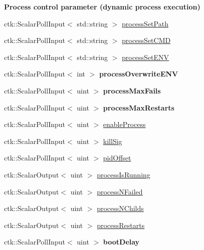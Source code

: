 \begin{Indent}{\bf Process control parameter (dynamic process execution)}\par
\begin{DoxyCompactItemize}
\item 
ctk\+::\+Scalar\+Poll\+Input$<$ std\+::string $>$ \hyperlink{structProcessControlModule_a2f3edf4b64217d9242034e876b74271e}{process\+Set\+Path}
\item 
ctk\+::\+Scalar\+Poll\+Input$<$ std\+::string $>$ \hyperlink{structProcessControlModule_a0f8c1a2b80ca32287fa60af12da681f7}{process\+Set\+C\+MD}
\item 
ctk\+::\+Scalar\+Poll\+Input$<$ std\+::string $>$ \hyperlink{structProcessControlModule_a95ed5208eb6265f71be5c96fa9b1bfd6}{process\+Set\+E\+NV}
\item 
ctk\+::\+Scalar\+Poll\+Input$<$ int $>$ {\bfseries process\+Overwrite\+E\+NV}
\item 
ctk\+::\+Scalar\+Poll\+Input$<$ uint $>$ {\bfseries process\+Max\+Fails}
\item 
ctk\+::\+Scalar\+Poll\+Input$<$ uint $>$ {\bfseries process\+Max\+Restarts}
\item 
ctk\+::\+Scalar\+Poll\+Input$<$ uint $>$ \hyperlink{structProcessControlModule_a0e5511753b568a4fde7d00caa1575299}{enable\+Process}
\item 
ctk\+::\+Scalar\+Poll\+Input$<$ uint $>$ \hyperlink{structProcessControlModule_a47ea8ec5bf7aa3914bb61f12c6aefe59}{kill\+Sig}
\item 
ctk\+::\+Scalar\+Poll\+Input$<$ uint $>$ \hyperlink{structProcessControlModule_a9a3ef4d12ac2b4794154ed091b655796}{pid\+Offset}
\item 
ctk\+::\+Scalar\+Output$<$ uint $>$ \hyperlink{structProcessControlModule_a63ba3083112290dc80113c7d0c29f6f9}{process\+Is\+Running}
\item 
ctk\+::\+Scalar\+Output$<$ uint $>$ \hyperlink{structProcessControlModule_a14a9aee3312baf85c8999c778b169039}{process\+N\+Failed}
\item 
ctk\+::\+Scalar\+Output$<$ uint $>$ \hyperlink{structProcessControlModule_ad5ec578c8e25d6117e9c45de024319bc}{process\+N\+Childs}
\item 
ctk\+::\+Scalar\+Output$<$ uint $>$ \hyperlink{structProcessControlModule_a52d785e727ec341c125e18c433f9fbe0}{process\+Restarts}
\item 
ctk\+::\+Scalar\+Poll\+Input$<$ uint $>$ {\bfseries boot\+Delay}
\end{DoxyCompactItemize}
\end{Indent}


